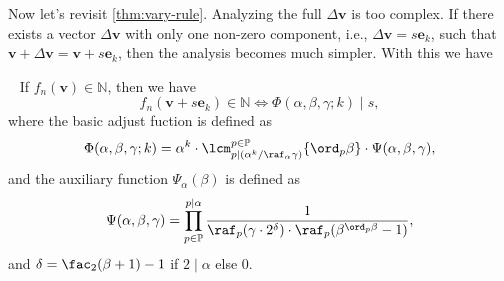 Now let's revisit \cref{thm:vary-rule}. Analyzing the full $\Delta\bm{v}$ is too complex. If there exists a vector $\Delta\bm{v}$ with only one non-zero component, i.e., $\Delta{\bm{v}} = s\bm{e}_{k}$, such that $\bm{v} + \Delta\bm{v} = \bm{v}+s\bm{e}_{k}$, then the analysis becomes much simpler. With this we have
\begin{theorem}~\label{thm:the-periodic-rule-of-reduce-sequence}
    If $f_{n}(\bm{v}) \in \mathbb{N}$, then we have
    \[f_{n}(\bm{v}+s\bm{e}_{k}) \in \mathbb{N}\Longleftrightarrow \Phi(\alpha,\beta,\gamma; k) \mid s, \]
    where the basic adjust fuction is defined as
    \[ \Phi(\alpha, \beta, \gamma; k) = \alpha^{k}\cdot\lcm_{p\mid (\alpha^{k}/\raf_{\alpha}\gamma)}^{p\in\mathbb{P}}\{\ord_{p}\beta\}\cdot\Psi(\alpha,\beta,\gamma), \]
    and the auxiliary function $\Psi_{\alpha}(\beta)$ is defined as
    \[ \Psi(\alpha,\beta,\gamma) = \prod_{p\in\mathbb{P}}^{p \mid \alpha}\frac{1}{\raf_{p}(\gamma\cdot2^{\delta})\cdot\raf_{p}(\beta^{\ord_{p}\beta} - 1)},
    \]
    and $\delta = \fac_2(\beta + 1) - 1$ if $2 \mid \alpha$ else $0$.
\end{theorem}
